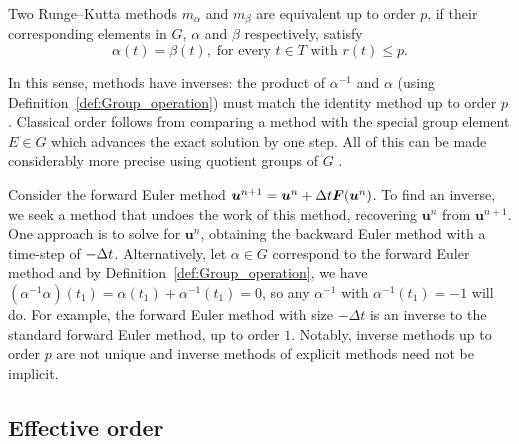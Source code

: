 \begin{definition}\label{def:Equivalent_methods}
	Two Runge--Kutta methods $m_\alpha$ and $m_\beta$ are equivalent up to order $p$, if their corresponding elements in $G$, $\alpha$ and $\beta$ respectively, satisfy
	\begin{displaymath}
		\alpha(t) = \beta(t), \; \text{for every $t \in T$ with $r(t) \leq p$}.
	\end{displaymath}
\end{definition}
In this sense, methods have inverses: the product of $\alpha^{-1}$ and $\alpha$ (using Definition~\ref{def:Group_operation}) must match the identity method up to order $p$ \cite{Butcher2008_book}.
Classical order follows from comparing a method with the special group element $E \in G$ which advances the exact solution by one step.
All of this can be made considerably more precise using quotient groups of $G$ \cite{Butcher2008_book}.


\begin{example}\label{ex:FE_inv_2}
  Consider the forward Euler method $\bm{u}^{n+1} = \bm{u}^{n} + \Delta t \bm{F}(\bm{u}^{n})$.
  To find an inverse, we seek a method that undoes the work of this method,
  recovering $\bm{u}^{n}$ from $\bm{u}^{n+1}$.
  One approach is to solve for $\bm{u}^{n}$, obtaining the backward Euler method
  with a time-step of $-\Delta t$.
  Alternatively, let $\alpha \in G$ correspond to the forward Euler method and by
  Definition~\ref{def:Group_operation}, we have
  $(\alpha^{-1}\alpha)(t_1) = \alpha(t_1) + \alpha^{-1}(t_1) = 0$,
  so any $\alpha^{-1}$ with $\alpha^{-1}(t_1) = -1$ will do.
  For example, the forward Euler method with size $-\Delta t$ is an inverse to
  the standard forward Euler method, up to order $1$.
  Notably, inverse methods up to order $p$ are not unique and inverse
  methods of explicit methods need not be implicit.
\end{example}


\subsection{Effective order}\label{sec:Effective_order}

